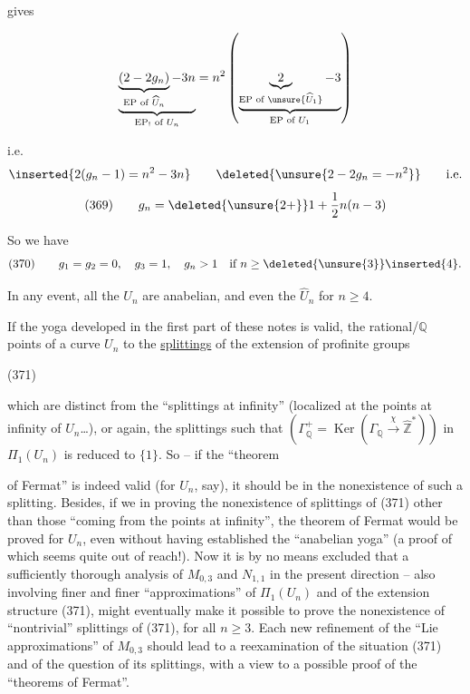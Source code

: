 
gives

\[
\underbrace{\underbrace{(2-2g_n)}_{\text{EP of }\widehat U_n}-3n}_{\text{EP}_{!}\text{ of }U_n}
=n^2\left(\underbrace{\underbrace{2}_{\text{EP of }\unsure{\widehat U_1}}-3}_{\text{EP of }U_1}\right)
\]

i.e.
\[
\inserted{2(g_n-1)=n^2-3n}
\qquad
\deleted{\unsure{2-2g_n=-n^2}}
\qquad \text{i.e.}
\]
\[
\text{(369)}\qquad g_n=\deleted{\unsure{2+}}1+\frac12 n(n-3)
\]

So we have
\[
\text{(370)}\qquad g_1=g_2=0,\quad g_3=1,\quad g_n>1\quad\text{if }n\geq\deleted{\unsure{3}}\inserted{4}.
\]

In any event, all the $U_n$ are anabelian, and even the $\widehat U_n$ for $n\geq4$.

If the  yoga developed in the first part of these notes is valid, the   rational/$\mathbb Q$ points of a curve $U_n$   to the \uline{splittings} of the extension of profinite groups

\noindent (371)

which are distinct from the ``splittings at infinity'' (localized at the  points at infinity of $U_n$\ldots), or again, the splittings such that  $(\Gamma_{\mathbb Q}^{+}=\operatorname{Ker}(\Gamma_{\mathbb Q}\xrightarrow{\chi}\widehat{\mathbb Z}^{*}))$ in $\Pi_1(U_n)$ is reduced to $\{1\}$. So -- if the ``theorem


of Fermat'' is indeed valid (for $U_n$, say), it should be  in the nonexistence of such a splitting. Besides, if we  in proving the nonexistence of splittings of (371) other than those ``coming from the points at infinity'', the theorem of Fermat would be proved for $U_n$, even without having established the ``anabelian yoga'' (a proof of which seems quite out of reach!). Now it is by no means excluded that a sufficiently thorough analysis of $M_{0,3}$ and $N_{1,1}$ in the present direction -- also involving finer and finer ``approximations'' of $\Pi_1(U_n)$ and of the extension structure (371), might eventually make it possible to prove the nonexistence of ``nontrivial'' splittings of (371), for all $n\geq3$. Each new refinement of the ``Lie approximations'' of $M_{0,3}$ should lead to a reexamination of the situation (371) and of the question of its splittings, with a view to a possible proof of the ``theorems of Fermat''.

